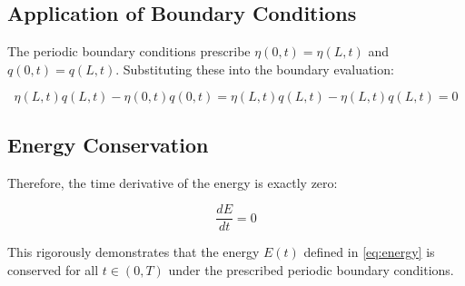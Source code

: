 \subsection{Application of Boundary Conditions}

The periodic boundary conditions prescribe \(\eta(0,t) = \eta(L,t)\) and \(q(0,t) = q(L,t)\). Substituting these into the boundary evaluation:

\begin{equation}
\eta(L,t)q(L,t) - \eta(0,t)q(0,t) = \eta(L,t)q(L,t) - \eta(L,t)q(L,t) = 0
\end{equation}

\subsection{Energy Conservation}

Therefore, the time derivative of the energy is exactly zero:

\begin{equation}
\frac{dE}{dt} = 0
\end{equation}

This rigorously demonstrates that the energy \(E(t)\) defined in \eqref{eq:energy} is conserved for all \(t \in (0,T)\) under the prescribed periodic boundary conditions.

